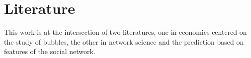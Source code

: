 \section{Literature}

This work is at the intersection of two literatures, one in economics centered on the study of bubbles, the other in network science and the prediction based on features of the social network.
